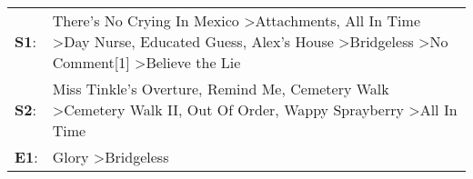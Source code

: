 \begin{supertabular}{p{0.03\textwidth}p{0.92\textwidth}}
 \textbf{S1}:  &  There's No Crying In Mexico\textsuperscript{} \textgreater \enspace Attachments\textsuperscript{}, \enspace All In Time\textsuperscript{} \textgreater \enspace Day Nurse\textsuperscript{}, \enspace Educated Guess\textsuperscript{}, \enspace Alex's House\textsuperscript{} \textgreater \enspace Bridgeless\textsuperscript{} \textgreater \enspace No Comment[1]\textsuperscript{} \textgreater \enspace Believe the Lie\textsuperscript{}  \enspace  \\
 \textbf{S2}:  &                                                                                                                       Miss Tinkle's Overture\textsuperscript{}, \enspace Remind Me\textsuperscript{}, \enspace Cemetery Walk\textsuperscript{} \textgreater \enspace Cemetery Walk II\textsuperscript{}, \enspace Out Of Order\textsuperscript{}, \enspace Wappy Sprayberry\textsuperscript{} \textgreater \enspace All In Time\textsuperscript{}  \enspace  \\
 \textbf{E1}:  &                                                                                                                                                                                                                                                                                                                                                                        Glory\textsuperscript{} \textgreater \enspace Bridgeless\textsuperscript{}  \enspace  \\
\end{supertabular}
